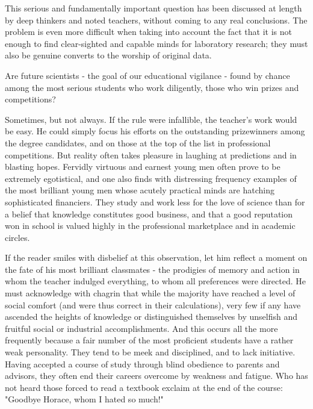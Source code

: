 \documentclass{article}
\begin{document}
This serious and fundamentally important question has been discussed at length by deep thinkers and noted teachers, without coming to any real conclusions. The problem is even more difficult when taking into account the fact that it is not enough to find clear-sighted and capable minds for laboratory research; they must also be genuine converts to the worship of original data.

Are future scientists - the goal of our educational vigilance - found by chance among the most serious students who work diligently, those who win prizes and competitions?

Sometimes, but not always. If the rule were infallible, the teacher’s work would be easy. He could simply focus his efforts on the outstanding prizewinners among the degree candidates, and on those at the top of the list in professional competitions. But reality often takes pleasure in laughing at predictions and in blasting hopes. Fervidly virtuous and earnest young men often prove to be extremely egotistical, and one also finds with distressing frequency examples of the most brilliant young men whose acutely practical minds are hatching sophisticated financiers. They study and work less for the love of science than for a belief that knowledge constitutes good business, and that a good reputation won in school is valued highly in the professional marketplace and in academic circles.

If the reader smiles with disbelief at this observation, let him reflect a moment on the fate of his most brilliant classmates - the prodigies of memory and action in whom the teacher indulged everything, to whom all preferences were directed. He must acknowledge with chagrin that while the majority have reached a level of social comfort (and were thus correct in their calculations), very few if any have ascended the heights of knowledge or distinguished themselves by unselfish and fruitful social or industrial accomplishments. And this occurs all the more frequently because a fair number of the most proficient students have a rather weak personality. They tend to be meek and disciplined, and to lack initiative. Having accepted a course of study through blind obedience to parents and advisors, they often end their careers overcome by weakness and fatigue. Who has not heard those forced to read a textbook exclaim at the end of the course: "Goodbye Horace, whom I hated so much!"
\end{document}
